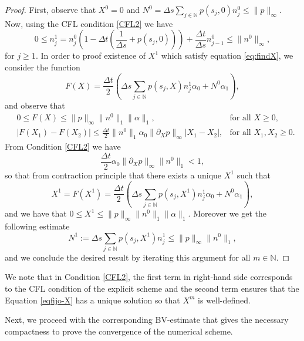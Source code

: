 \documentclass[11pt,a4paper]{article}
\newcommand{\N}{\mathbb{N}}
\begin{document}
\begin{proof}
First, observe that $X^0=0$ and $N^0=\Delta s\sum_{j\in\N} p(s_j,0)n_j^0 \le \|p\|_\infty $. Now, using the CFL condition \eqref{CFL2} we have 
\begin{equation*} 
    0\le n_j^{1}=n_j^0 \left(1-\Delta t \left(\frac{1}{\Delta s}+p(s_j,0) \right) \right) +\frac{\Delta t}{\Delta s} n_{j-1}^0\le \|n^0\|_{\infty},
\end{equation*}
for $j\geq1$. In order to proof existence of $X^1$ which satisfy equation \eqref{eq:findX}, we consider the function 
\begin{equation*}
F(X)=\frac{\Delta t}{2} \left( \Delta s \sum_{j\in\N}p(s_j,X)n_j^1 \alpha_0 + N^0\alpha_{1} \right),
\end{equation*}
and observe that
\begin{eqnarray*}
&0\le F(X)\le\|p\|_{\infty}\|n^0\|_1\|\alpha\|_1,& \text{for all } X\ge 0,\\
&|F(X_1)-F(X_2)|\le \frac{\Delta t}{2}\|n^0\|_1\alpha_0\|\partial_Xp\|_{\infty}|X_1-X_2|,&  \text{for all } X_1,X_2\ge 0.
\end{eqnarray*}
From Condition \eqref{CFL2} we have
\begin{equation*}
\frac{\Delta t}{2}\alpha_0\|\partial_Xp\|_{\infty}\|n^0\|_1<1,
\end{equation*}
so that from contraction principle that there exists a unique $X^1$ such that
\begin{equation*}
X^1=F(X^1)=\frac{\Delta t}{2} \left( \Delta s \sum_{j\in\N}p(s_j,X^1)n_j^1 \alpha_0 + N^0\alpha_{1} \right),
\end{equation*}
and we have that $0\le X^1\le \|p\|_{\infty}\|n^0\|_1 \|\alpha\|_1$. Moreover we get the following estimate
\begin{equation*}
    N^1:= \Delta s \sum_{j\in\N} p(s_j,X^1)n_j^1\le \|p\|_{\infty} \|n^0\|_{1},
\end{equation*}
and we conclude the desired result by iterating this argument for all $m\in\N$.
\end{proof}

We note that in Condition \eqref{CFL2}, the first term in right-hand side corresponds to the CFL condition of the explicit scheme and the second term ensures that the Equation \eqref{eqfijo-X} has a unique solution so that $X^m$ is well-defined.

Next, we proceed with the corresponding BV-estimate that gives the necessary compactness to prove the convergence of the numerical scheme.
 
\end{document}
